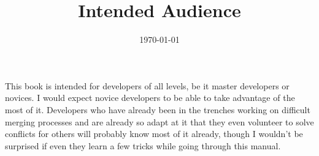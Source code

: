 \documentclass{article}
\title{Intended Audience}
\date{\today}
\begin{document}
\maketitle

This book is intended for developers of all levels, be it master developers or novices. I would expect novice developers to be able to take advantage of the most of it. Developers who have already been in the trenches working on difficult merging processes and are already so adapt at it that they even volunteer to solve conflicts for others will probably know most of it already, though I wouldn't be surprised if even they learn a few tricks while going through this manual.
\end{document}
